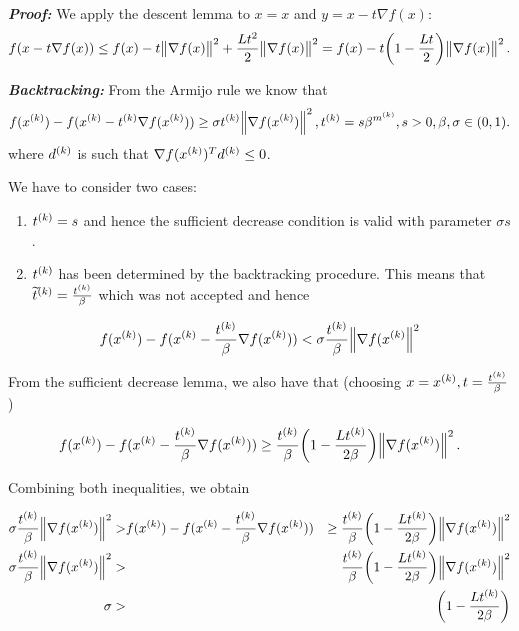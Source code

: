 \documentclass[12pt,a4paper]{article}
\begin{document}
    \textbf{\textit{Proof:}} We apply the descent lemma to $x = x$ and $y = x - t\nabla f(x)$:
    \begin{equation*}
    f(x-t\nabla f(x)) \leq f(x) - t\norm{\nabla f(x)}^2 + \frac{Lt^2}{2}\norm{\nabla f(x)}^2 = f(x) - t\biggl(1 - \frac{Lt}{2}\biggr)\norm{\nabla f(x)}^2.
	\end{equation*}
    
    \textbf{\textit{Backtracking:}} From the Armijo rule we know that
    \begin{equation*}
     f(x^{(k)}) - f(x^{(k)} - t^{(k)}\nabla f(x^{(k)})) \geq  \sigma t^{(k)}  \norm{\nabla f(x^{(k)})}^2, t^{(k)}=s \beta^{m^{(k)}}, s > 0, \beta,\sigma \in (0,1).
	\end{equation*}
	where $d^{(k)}$ is such that $\nabla f(x^{(k)})^Td^{(k)}\leq0$. 
	
	We have to consider two cases:
	\begin{enumerate}[I:]
	\item $t^{(k)} = s$ and hence the sufficient decrease condition is valid with parameter $\sigma s$.
	\item $t^{(k)}$ has been determined by the backtracking procedure. This means that $\widetilde{t}^{(k)} = \frac{t^{(k)}}{\beta}$ which was not accepted and hence
	
	\end{enumerate}
	\begin{equation*}
     f(x^{(k)}) - f(x^{(k)} - \frac{t^{(k)}}{\beta}\nabla f(x^{(k)})) < \sigma \frac{t^{(k)}}{\beta} \norm{\nabla f(x^{(k)}}^2
	\end{equation*}
    
    From the sufficient decrease lemma, we also have that (choosing $x = x^{(k)} , t = \frac{t^{(k)}}{\beta}$)
    
    \begin{equation*}
     f(x^{(k)}) - f(x^{(k)} - \frac{t^{(k)}}{\beta}\nabla f(x^{(k)})) \geq  \frac{t^{(k)}}{\beta}\biggl(1 - \frac{Lt^{(k)}}{2\beta}\biggr)\norm{\nabla f(x^{(k)})}^2.
	\end{equation*}
	
	Combining both inequalities, we obtain
	
	\begin{align*}
     \sigma \frac{t^{(k)}}{\beta} \norm{\nabla f(x^{(k)})}^2 >& f(x^{(k)}) - f(x^{(k)} - \frac{t^{(k)}}{\beta} \nabla f(x^{(k)})) &\geq \frac{t^{(k)}}{\beta} \biggl(1 - \frac{Lt^{(k)}}{2\beta} \biggr) \norm{\nabla f(x^{(k)})}^2 &\\
      \sigma \frac{t^{(k)}}{\beta} \norm{\nabla f(x^{(k)})}^2 >&&  \frac{t^{(k)}}{\beta}\biggl(1 - \frac{Lt^{(k)}}{2\beta}\biggr)\norm{\nabla f(x^{(k)})}^2 &\\ 
      \sigma >&& \biggl(1 - \frac{Lt^{(k)}}{2\beta}\biggr)& 
	\end{align*}
	
\end{document}
